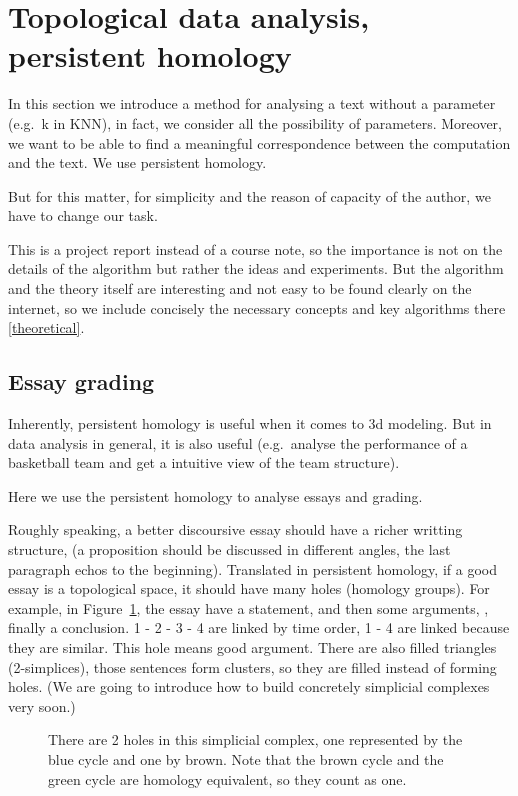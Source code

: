 \section{Topological data analysis, persistent homology}

In this section we introduce a method for analysing a text
without a parameter (e.g.\ k in KNN), in fact, we consider all
the possibility of parameters. Moreover, we want to be able to
find a meaningful correspondence between the computation and
the text. We use persistent homology.

But for this matter, for simplicity and the reason of capacity
of the author, we have to change our task.

This is a project report instead of a course note, so the importance
is not on the details of the algorithm but rather the ideas and experiments.
But the algorithm and the theory itself are interesting and not
easy to be found clearly on the internet, so we include concisely the necessary
concepts and key algorithms there \ref{theoretical}.

\subsection{Essay grading}

Inherently, persistent homology is useful when it comes to 3d modeling.
But in data analysis in general, it is also useful (e.g.\ analyse the
performance of a basketball team and get a intuitive view of the team structure).

Here we use the persistent homology to analyse essays and grading.

Roughly speaking, a better discoursive essay should have a
richer writting structure, (a proposition should be discussed
in different angles, the last paragraph echos to the beginning).
Translated in persistent homology,
if a good essay is a topological space, it should have
many holes (homology groups). For example,
in Figure~\ref{apple}, the essay have a statement, and then some arguments,
, finally a conclusion. 1 - 2 - 3 - 4 are linked by time order, 1 - 4 are linked because they are similar.
This hole means good argument. There are also filled triangles (2-simplices), those
sentences form clusters, so they are filled instead of forming holes.
(We are going to introduce how to build concretely simplicial complexes very soon.)

\begin{figure}[H]
  \centering
  
  \caption{There are 2 holes in this simplicial complex,
  one represented by the blue cycle and one by brown.
  Note that the brown cycle and the green cycle are homology equivalent, so they count as one.}
  \label{apple}
\end{figure}

